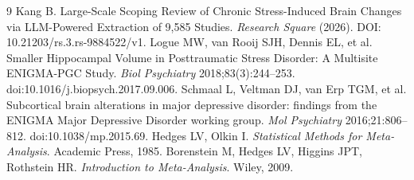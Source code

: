 \documentclass[11pt]{article}
\begin{document}
\begin{thebibliography}{9}
 Kang B. Large-Scale Scoping Review of Chronic
Stress-Induced Brain Changes via LLM-Powered Extraction of 9,585 Studies. {\it
Research Square} (2026). DOI: 10.21203/rs.3.rs-9884522/v1.
 Logue MW, van Rooij SJH, Dennis EL, et al. Smaller
Hippocampal Volume in Posttraumatic Stress Disorder: A Multisite ENIGMA-PGC
Study. {\it Biol Psychiatry} 2018;83(3):244--253.
doi:10.1016/j.biopsych.2017.09.006.
 Schmaal L, Veltman DJ, van Erp TGM, et al. Subcortical
brain alterations in major depressive disorder: findings from the ENIGMA Major
Depressive Disorder working group. {\it Mol Psychiatry} 2016;21:806--812.
doi:10.1038/mp.2015.69.
 Hedges LV, Olkin I. {\it Statistical Methods for
Meta-Analysis}. Academic Press, 1985.
 Borenstein M, Hedges LV, Higgins JPT, Rothstein HR.
{\it Introduction to Meta-Analysis}. Wiley, 2009.
\end{thebibliography}
\end{document}
